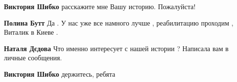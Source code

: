 \begin{multicols}{2}
\begin{itemize}
\begin{itemize}
\textbf{Виктория Шибко} расскажите мне Вашу историю. Пожалуйста!

\textbf{Полина Бутт} Да .
У нас уже все намного лучше , реабилитацию проходим , Виталик в Киеве .

\textbf{Наталя Дєдова} Что именно интересует с нашей истории ?
Написала вам в личные сообщения.

\textbf{Виктория Шибко} держитесь, ребята 🙏

\end{itemize} %

\end{itemize} %

\end{multicols} %
